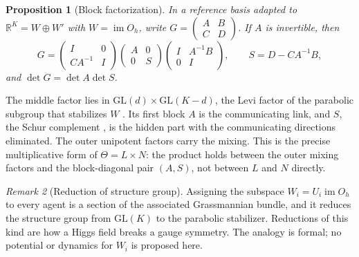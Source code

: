 \documentclass[11pt]{article}
\newtheorem{proposition}{Proposition}
\theoremstyle{definition}
\theoremstyle{remark}
\newtheorem{remark}[proposition]{Remark}
\newcommand{\GL}{\mathrm{GL}}
\newcommand{\im}{\operatorname{im}}
\begin{document}
\begin{proposition}[Block factorization]
\label{prop:levi}
In a reference basis adapted to $\mathbb R^K=W\oplus W'$ with $W=\im O_h$, write $G=\begin{pmatrix}A&B\\C&D\end{pmatrix}$. If $A$ is invertible, then
\begin{equation}
G=\begin{pmatrix}I&0\\CA^{-1}&I\end{pmatrix}
\begin{pmatrix}A&0\\0&S\end{pmatrix}
\begin{pmatrix}I&A^{-1}B\\0&I\end{pmatrix},\qquad S=D-CA^{-1}B,
\label{eq:levi}
\end{equation}
and $\det G=\det A\det S$.
\end{proposition}

The middle factor lies in $\GL(d)\times\GL(K-d)$, the Levi factor of the parabolic subgroup that stabilizes $W$ \cite{humphreys1975}. Its first block $A$ is the communicating link, and $S$, the Schur complement \cite{zhang2005schur}, is the hidden part with the communicating directions eliminated. The outer unipotent factors carry the mixing. This is the precise multiplicative form of $\Theta=L\times N$: the product holds between the outer mixing factors and the block-diagonal pair $(A,S)$, not between $L$ and $N$ directly.

\begin{remark}[Reduction of structure group]
Assigning the subspace $W_i=U_i\im O_h$ to every agent is a section of the associated Grassmannian bundle, and it reduces the structure group from $\GL(K)$ to the parabolic stabilizer. Reductions of this kind are how a Higgs field breaks a gauge symmetry. The analogy is formal; no potential or dynamics for $W_i$ is proposed here.
\end{remark}
\end{document}
